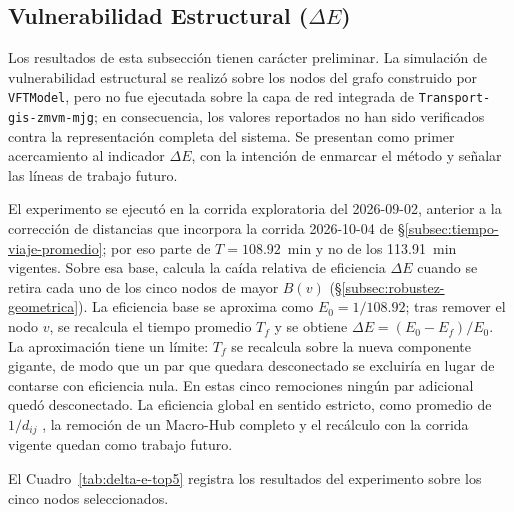 \subsection{Vulnerabilidad Estructural (\texorpdfstring{$\Delta E$}{Delta E})}
\label{subsec:vulnerabilidad-estructural}

Los resultados de esta subsección tienen carácter preliminar. La simulación de
vulnerabilidad estructural se realizó sobre los nodos del grafo construido por
\texttt{VFTModel}, pero no fue ejecutada sobre la capa de red integrada de
\texttt{Transport-gis-zmvm-mjg}; en consecuencia, los valores reportados no han sido
verificados contra la representación completa del sistema. Se presentan como
primer acercamiento al indicador $\Delta E$, con la intención de enmarcar el
método y señalar las líneas de trabajo futuro.

El experimento se ejecutó en la corrida exploratoria del 2026-09-02, anterior a
la corrección de distancias que incorpora la corrida 2026-10-04 de
§\ref{subsec:tiempo-viaje-promedio}; por eso parte de $T = 108.92$~min y no de
los 113.91~min vigentes. Sobre esa base, calcula la caída relativa de eficiencia
$\Delta E$ cuando se retira cada uno de los cinco nodos de mayor $B(v)$
(§\ref{subsec:robustez-geometrica}). La eficiencia base se aproxima como
$E_0 = 1/108.92$; tras remover el nodo $v$, se recalcula el tiempo promedio
$T_f$ y se obtiene $\Delta E = (E_0 - E_f)/E_0$. La aproximación tiene un
límite: $T_f$ se recalcula sobre la nueva componente gigante, de modo que un par
que quedara desconectado se excluiría en lugar de contarse con eficiencia nula.
En estas cinco remociones ningún par adicional quedó desconectado. La eficiencia
global en sentido estricto, como promedio de $1/d_{ij}$
\citep{latora2001efficient}, la remoción de un Macro-Hub completo y el recálculo
con la corrida vigente quedan como trabajo futuro.

El Cuadro~\ref{tab:delta-e-top5} registra los resultados del experimento sobre
los cinco nodos seleccionados.

